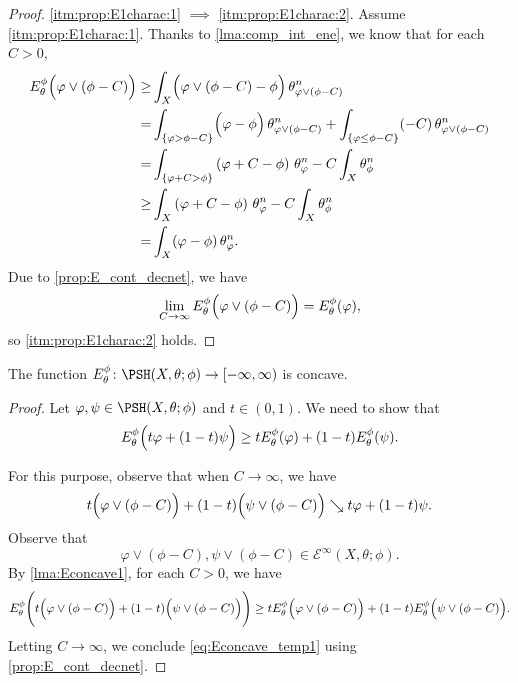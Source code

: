 \begin{proof}
    \ref{itm:prop:E1charac:1} $\implies$ \ref{itm:prop:E1charac:2}. Assume \ref{itm:prop:E1charac:1}. Thanks to \cref{lma:comp_int_ene}, we know that for each $C>0$,
    \[
    \begin{aligned}
    E_{\theta}^{\phi}\Bigl(\varphi\lor (\phi-C)\Bigr)\geq & \int_X \Bigl(\varphi\lor (\phi-C)-\phi \Bigr)\,\theta_{\varphi\lor (\phi-C)}^n\\
    =& \int_{\left\{ \varphi>\phi-C \right\}} \Bigl(\varphi-\phi \Bigr)\,\theta_{\varphi \lor (\phi-C)}^n+ \int_{\left\{ \varphi\leq \phi-C \right\}} (-C)\,\theta_{\varphi\lor (\phi-C)}^n \\
    =& \int_{\{\varphi+C>\phi\}} \left(\varphi+C-\phi \right)\,\theta_{\varphi}^n-C\int_X \theta_{\phi}^n\\
    \geq & \int_X \left(\varphi+C-\phi \right)\,\theta_{\varphi}^n-C\int_X \theta_{\phi}^n\\
    =& \int_X (\varphi-\phi)\,\theta_{\varphi}^n.
    \end{aligned}
    \]
    Due to \cref{prop:E_cont_decnet}, we have
    \[
    \lim_{C\to\infty}E_{\theta}^{\phi}\Bigl(\varphi\lor (\phi-C)\Bigr)=E_{\theta}^{\phi}(\varphi),
    \]
    so \ref{itm:prop:E1charac:2} holds.
\end{proof}

\begin{corollary}\label{cor:E_concave2}
    The function $E^{\phi}_{\theta}\colon \PSH(X,\theta;\phi)\rightarrow [-\infty,\infty)$ is concave.
\end{corollary}
\begin{proof}
    Let $\varphi,\psi\in \PSH(X,\theta;\phi)$ and $t\in (0,1)$. We need to show that
    \begin{equation}\label{eq:Econcave_temp1}
    E^{\phi}_{\theta}\Bigl( t\varphi+(1-t)\psi \Bigr)\geq tE^{\phi}_{\theta}(\varphi)+(1-t)E^{\phi}_{\theta}(\psi).
    \end{equation}

    For this purpose, observe that when $C\to \infty$, we have
    \[
        t\Bigl(\varphi\lor (\phi-C)\Bigr)+(1-t)\Bigl(\psi\lor (\phi-C)\Bigr)\searrow t\varphi+(1-t)\psi.
    \]
    Observe that
    \[
        \varphi\lor (\phi-C),\psi\lor (\phi-C)\in \mathcal{E}^{\infty}(X,\theta;\phi).
    \]
    By \cref{lma:Econcave1}, for each $C>0$, we have
    \[
        E_{\theta}^{\phi}\Biggl( t\Bigl(\varphi\lor (\phi-C)\Bigr)+(1-t)\Bigl(\psi\lor (\phi-C)\Bigr) \Biggr)\geq tE_{\theta}^{\phi}\Bigl(\varphi\lor (\phi-C)\Bigr)+(1-t)E_{\theta}^{\phi}\Bigl(\psi\lor (\phi-C)\Bigr).
    \]
    Letting $C\to \infty$, we conclude \eqref{eq:Econcave_temp1} using \cref{prop:E_cont_decnet}.
\end{proof}

